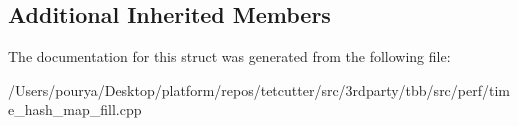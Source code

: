 \subsection*{Additional Inherited Members}


The documentation for this struct was generated from the following file\+:\begin{DoxyCompactItemize}
\item 
/\+Users/pourya/\+Desktop/platform/repos/tetcutter/src/3rdparty/tbb/src/perf/time\+\_\+hash\+\_\+map\+\_\+fill.\+cpp\end{DoxyCompactItemize}
